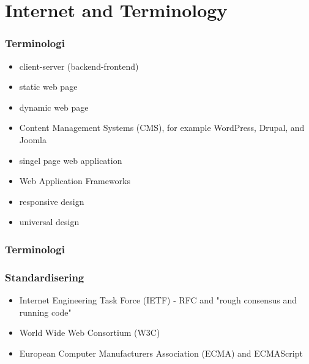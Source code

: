 \section{Internet and Terminology}

\begin{frame}[fragile]
\frametitle{Terminologi}
\color{structure}
\begin{itemize}\color{structure}
  \item client-server (backend-frontend)
  \item static web page
  \item dynamic web page
  \item Content Management Systems (CMS), for example WordPress, Drupal, and Joomla
  \item singel page web application
  \item Web Application Frameworks
  \item responsive design
  \item universal design
\end{itemize}
\end{frame}

\begin{frame}[fragile]
\frametitle{Terminologi}
\color{structure}
\end{frame}

\begin{frame}[fragile]
\frametitle{Standardisering}
\color{structure}
\begin{itemize}\color{structure}
  \item Internet Engineering Task Force (IETF) - RFC and "rough consensus and running code"
  \item World Wide Web Consortium (W3C)
  \item European Computer Manufacturers Association (ECMA) and ECMAScript
\end{itemize}
\end{frame}
